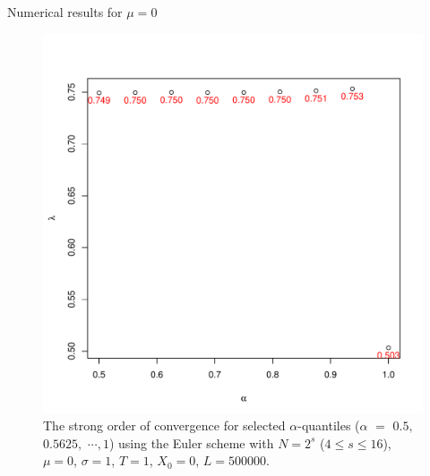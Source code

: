 \documentclass[cjk,10pt]{beamer}
\begin{document}
\begin{frame}{Numerical results for $\mu=0$}
 \begin{figure}[p]
   \includegraphics[scale=0.3]{nout_0arato.pdf} %
   \caption{The strong order of convergence for selected $\alpha$-quantiles ($\alpha $ $=$ $ 0.5,$ $0.5625,$ $\cdots, 1$) using the Euler scheme with $N = 2^s$ ($4\le s \le 16$), $\mu=0$, $\sigma=1$, $T=1$, $X_0=0$, $L=500000$.}
   \label{f:ratio}
\end{figure}
\end{frame}
\end{document}
